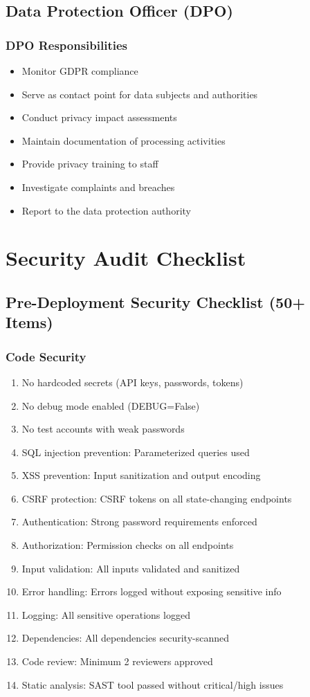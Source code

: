 \documentclass{report}
\begin{document}
\section{Data Protection Officer (DPO)}

\subsection{DPO Responsibilities}
\begin{itemize}
\item Monitor GDPR compliance
\item Serve as contact point for data subjects and authorities
\item Conduct privacy impact assessments
\item Maintain documentation of processing activities
\item Provide privacy training to staff
\item Investigate complaints and breaches
\item Report to the data protection authority
\end{itemize}

\chapter{Security Audit Checklist}

\section{Pre-Deployment Security Checklist (50+ Items)}

\subsection{Code Security}
\begin{enumerate}
\item No hardcoded secrets (API keys, passwords, tokens)
\item No debug mode enabled (DEBUG=False)
\item No test accounts with weak passwords
\item SQL injection prevention: Parameterized queries used
\item XSS prevention: Input sanitization and output encoding
\item CSRF protection: CSRF tokens on all state-changing endpoints
\item Authentication: Strong password requirements enforced
\item Authorization: Permission checks on all endpoints
\item Input validation: All inputs validated and sanitized
\item Error handling: Errors logged without exposing sensitive info
\item Logging: All sensitive operations logged
\item Dependencies: All dependencies security-scanned
\item Code review: Minimum 2 reviewers approved
\item Static analysis: SAST tool passed without critical/high issues
\end{enumerate}
\end{document}
